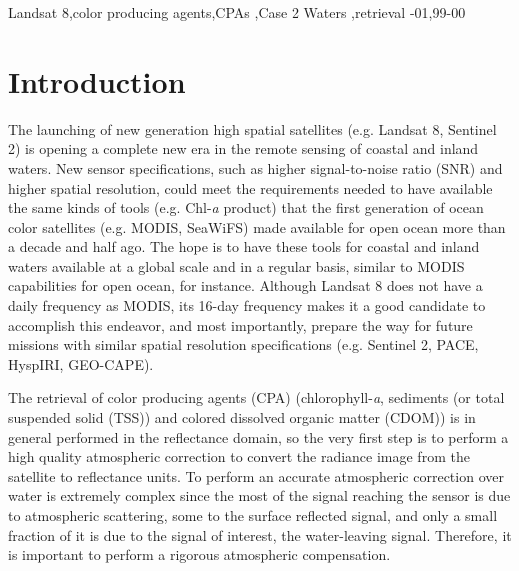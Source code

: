 \documentclass[onecolumn,3p]{elsarticle}
\begin{document}
\begin{frontmatter}
\begin{abstract}
\end{abstract}

\begin{keyword}
Landsat 8\sep color producing agents\sep CPAs \sep Case 2 Waters \sep retrieval
-01\sep  99-00
\end{keyword}

\end{frontmatter}
\section{Introduction}
The launching of new generation high spatial satellites (e.g. Landsat 8, Sentinel 2) is opening a complete new era in the remote sensing of coastal and inland waters. New sensor specifications, such as higher signal-to-noise ratio (SNR) and higher spatial resolution, could meet the requirements needed to have available the same kinds of tools (e.g. Chl-{\it a} product) that the first generation of ocean color satellites (e.g. MODIS, SeaWiFS) made available for open ocean more than a decade and half ago. The hope is to have these tools for coastal and inland waters available at a global scale and in a regular basis, similar to MODIS capabilities for open ocean, for instance. Although Landsat 8 does not have a daily frequency as MODIS, its 16-day frequency makes it a good candidate to accomplish this endeavor, and most importantly, prepare the way for future missions with similar spatial resolution specifications (e.g. Sentinel 2, PACE, HyspIRI, GEO-CAPE).

The retrieval of color producing agents (CPA) (chlorophyll-{\it a}, sediments (or total suspended solid (TSS)) and colored dissolved organic matter (CDOM)) is in general performed in the reflectance domain, so the very first step is to perform a high quality atmospheric correction to convert the radiance image from the satellite to reflectance units. To perform an accurate atmospheric correction over water is extremely complex since the most of the signal reaching the sensor is due to atmospheric scattering, some to the surface reflected signal, and only a small fraction of it is due to the signal of interest, the water-leaving signal. Therefore, it is important to perform a rigorous atmospheric compensation. 
\end{document}
